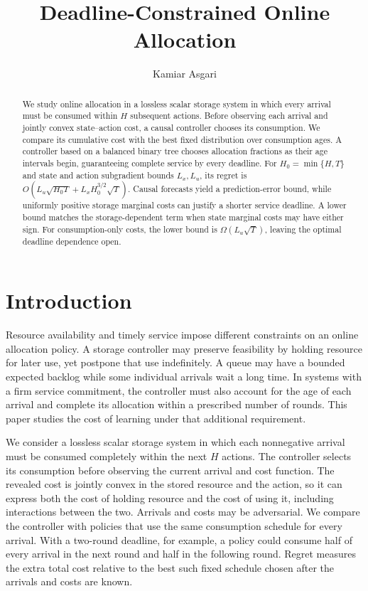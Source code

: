\documentclass[11pt]{article}
\title{Deadline-Constrained Online Allocation}
\author{Kamiar Asgari}
\date{}
\theoremstyle{plain}
\theoremstyle{remark}
\numberwithin{equation}{section}
\begin{document}
\maketitle

\begin{abstract}
We study online allocation in a lossless scalar storage system in which
every arrival must be consumed within $H$ subsequent actions. Before
observing each arrival and jointly convex state--action cost, a causal
controller chooses its consumption. We compare its cumulative cost with
the best fixed distribution over consumption ages. A controller based on
a balanced binary tree chooses allocation fractions as their age intervals
begin, guaranteeing complete service by every deadline. For
$H_0=\min\{H,T\}$ and state and action subgradient bounds $L_x,L_u$, its regret is
$O(L_u\sqrt{H_0T}+L_xH_0^{3/2}\sqrt T)$.
Causal forecasts yield a prediction-error bound, while uniformly positive
storage marginal costs can justify a shorter service deadline.
A lower bound matches the storage-dependent term when state marginal costs
may have either sign. For consumption-only costs, the lower bound is
$\Omega(L_u\sqrt T)$, leaving the optimal deadline dependence open.
\end{abstract}

\section{Introduction}
\label{ch6:sec:introduction}

Resource availability and timely service impose different constraints on an
online allocation policy. A storage controller may preserve feasibility by
holding resource for later use, yet postpone that use indefinitely. A queue
may have a bounded expected backlog while some individual arrivals wait a
long time. In systems with a firm service commitment, the controller must
also account for the age of each arrival and complete its allocation within
a prescribed number of rounds. This paper studies the cost of learning
under that additional requirement.

We consider a lossless scalar storage system in which each nonnegative
arrival must be consumed completely within the next $H$ actions. The
controller selects its consumption before observing the current arrival
and cost function. The revealed cost is jointly convex in the stored
resource and the action, so it can express both the cost of holding resource
and the cost of using it, including interactions between the two. Arrivals
and costs may be adversarial. We compare the controller with policies that
use the same consumption schedule for every arrival. With a two-round
deadline, for example, a policy could consume half of every arrival in the
next round and half in the following round. Regret measures the extra total
cost relative to the best such fixed schedule chosen after the arrivals and
costs are known.
\end{document}
